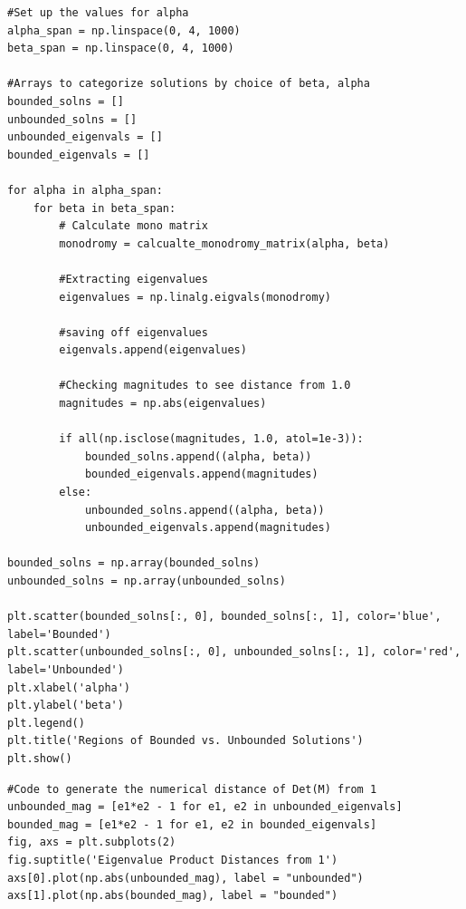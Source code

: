 \documentclass[12pt]{article}
\newcommand{\jump}{\vspace{5mm}}
\begin{document}
\begin{enumerate}[]
\begin{lstlisting}
#Set up the values for alpha
alpha_span = np.linspace(0, 4, 1000)
beta_span = np.linspace(0, 4, 1000)

#Arrays to categorize solutions by choice of beta, alpha
bounded_solns = []
unbounded_solns = []
unbounded_eigenvals = []
bounded_eigenvals = []

for alpha in alpha_span:
    for beta in beta_span:
        # Calculate mono matrix
        monodromy = calcualte_monodromy_matrix(alpha, beta)
        
        #Extracting eigenvalues
        eigenvalues = np.linalg.eigvals(monodromy)
        
        #saving off eigenvalues
        eigenvals.append(eigenvalues)
        
        #Checking magnitudes to see distance from 1.0
        magnitudes = np.abs(eigenvalues)
        
        if all(np.isclose(magnitudes, 1.0, atol=1e-3)):
            bounded_solns.append((alpha, beta))
            bounded_eigenvals.append(magnitudes)
        else:
            unbounded_solns.append((alpha, beta))
            unbounded_eigenvals.append(magnitudes)
            
bounded_solns = np.array(bounded_solns)
unbounded_solns = np.array(unbounded_solns)

plt.scatter(bounded_solns[:, 0], bounded_solns[:, 1], color='blue', label='Bounded')
plt.scatter(unbounded_solns[:, 0], unbounded_solns[:, 1], color='red', label='Unbounded')
plt.xlabel('alpha')
plt.ylabel('beta')
plt.legend()
plt.title('Regions of Bounded vs. Unbounded Solutions')
plt.show()
\end{lstlisting}

\jump
\begin{lstlisting}
#Code to generate the numerical distance of Det(M) from 1
unbounded_mag = [e1*e2 - 1 for e1, e2 in unbounded_eigenvals]
bounded_mag = [e1*e2 - 1 for e1, e2 in bounded_eigenvals]
fig, axs = plt.subplots(2)
fig.suptitle('Eigenvalue Product Distances from 1')
axs[0].plot(np.abs(unbounded_mag), label = "unbounded")
axs[1].plot(np.abs(bounded_mag), label = "bounded")
\end{lstlisting}


\end{enumerate}
\end{document}
